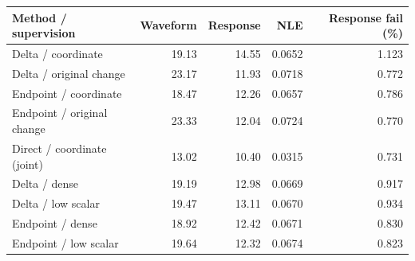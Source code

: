 \begin{tabular}{lrrrr}\toprule
Method / supervision & Waveform & Response & NLE & Response fail (\%)\\\midrule
Delta / coordinate & 19.13 & 14.55 & 0.0652 & 1.123 \\
Delta / original change & 23.17 & 11.93 & 0.0718 & 0.772 \\
Endpoint / coordinate & 18.47 & 12.26 & 0.0657 & 0.786 \\
Endpoint / original change & 23.33 & 12.04 & 0.0724 & 0.770 \\
Direct / coordinate (joint) & 13.02 & 10.40 & 0.0315 & 0.731 \\
Delta / dense & 19.19 & 12.98 & 0.0669 & 0.917 \\
Delta / low scalar & 19.47 & 13.11 & 0.0670 & 0.934 \\
Endpoint / dense & 18.92 & 12.42 & 0.0671 & 0.830 \\
Endpoint / low scalar & 19.64 & 12.32 & 0.0674 & 0.823 \\
\bottomrule\end{tabular}
